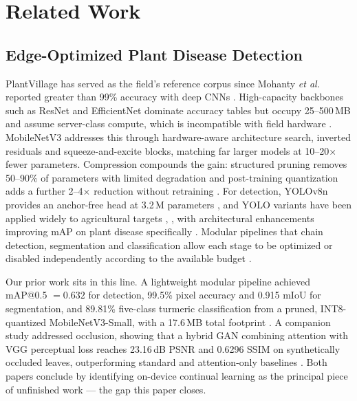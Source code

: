 \documentclass[journal]{IEEEtran}
\begin{document}
\section{Related Work}
\label{sec:related}

\subsection{Edge-Optimized Plant Disease Detection}

PlantVillage \cite{ref1} has served as the field's reference corpus since Mohanty
\textit{et al.} reported greater than 99\% accuracy with deep CNNs \cite{ref2}.
High-capacity backbones such as ResNet \cite{ref3} and EfficientNet \cite{ref4}
dominate accuracy tables but occupy 25--500\,MB and assume server-class compute,
which is incompatible with field hardware \cite{ref5}. MobileNetV3 \cite{ref6}
addresses this through hardware-aware architecture search, inverted residuals and
squeeze-and-excite blocks, matching far larger models at 10--20$\times$ fewer
parameters. Compression compounds the gain: structured pruning removes 50--90\% of
parameters with limited degradation \cite{ref7} and post-training quantization adds
a further 2--4$\times$ reduction without retraining \cite{ref8}. For detection,
YOLOv8n provides an anchor-free head at 3.2\,M parameters \cite{ref9}, and YOLO
variants have been applied widely to agricultural targets \cite{ref10},
\cite{ref11}, with architectural enhancements improving mAP on plant disease
specifically \cite{ref11}. Modular pipelines that chain detection, segmentation and
classification allow each stage to be optimized or disabled independently according
to the available budget \cite{ref12}.

Our prior work sits in this line. A lightweight modular pipeline achieved
mAP@0.5 $=0.632$ for detection, 99.5\% pixel accuracy and 0.915 mIoU for
segmentation, and 89.81\% five-class turmeric classification from a pruned,
INT8-quantized MobileNetV3-Small, with a 17.6\,MB total footprint \cite{ref21}.
A companion study addressed occlusion, showing that a hybrid GAN combining attention
with VGG perceptual loss reaches 23.16\,dB PSNR and 0.6296 SSIM on synthetically
occluded leaves, outperforming standard and attention-only baselines \cite{ref22}.
Both papers conclude by identifying on-device continual learning as the principal
piece of unfinished work --- the gap this paper closes.
\end{document}
